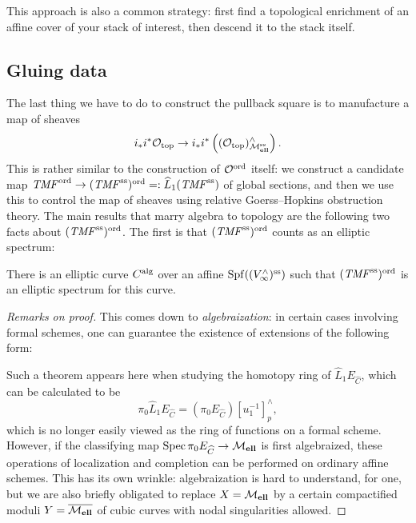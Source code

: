 \begin{remark}
This approach is also a common strategy: first find a topological enrichment of an affine cover of your stack of interest, then descend it to the stack itself.
\end{remark}





\subsection*{Gluing data}

The last thing we have to do to construct the pullback square is to manufacture a map of sheaves \[i_* i^* \mathcal{O}_{\mathrm{top}} \to i_* i^* \left((\mathcal{O}_{\mathrm{top}})^\wedge_{\mathcal{M}_{\mathbf{ell}}^{\mathrm{ss}}}\right).\]  This is rather similar to the construction of $\mathcal{O}^{\mathrm{ord}}$ itself: we construct a candidate map $\mathit{TMF}^{\mathrm{ord}} \to (\mathit{TMF}^{\mathrm{ss}})^{\mathrm{ord}} =: \widehat L_1 (\mathit{TMF}^{\mathrm{ss}})$ of global sections, and then we use this to control the map of sheaves using relative Goerss--Hopkins obstruction theory.  The main results that marry algebra to topology are the following two facts about $(\mathit{TMF}^{\mathrm{ss}})^{\mathrm{ord}}$.  The first is that $(\mathit{TMF}^{\mathrm{ss}})^{\mathrm{ord}}$ counts as an elliptic spectrum:

\begin{lemma}
There is an elliptic curve $C^{\mathrm{alg}}$ over an affine $\operatorname{Spf} ((V^\wedge_\infty)^{\mathrm{ss}})$ such that $(\mathit{TMF}^{\mathrm{ss}})^{\mathrm{ord}}$ is an elliptic spectrum for this curve.
\end{lemma}
\begin{proof}[Remarks on proof]
This comes down to \textit{algebraization}: in certain cases involving formal schemes, one can guarantee the existence of extensions of the following form:
\begin{center}
\end{center}
Such a theorem appears here when studying the homotopy ring of $\widehat L_1 E_{\widehat C}$, which can be calculated to be \[\pi_0 \widehat L_1 E_{\widehat C} = (\pi_0 E_{\widehat C})[u_1^{-1}]^\wedge_p,\] which is no longer easily viewed as the ring of functions on a formal scheme.  However, if the classifying map $\operatorname{Spec} \pi_0 E_{\widehat C} \to \mathcal{M}_{\mathbf{ell}}$ is first algebraized, these operations of localization and completion can be performed on ordinary affine schemes.  This has its own wrinkle: algebraization is hard to understand, for one, but we are also briefly obligated to replace $X = \mathcal{M}_{\mathbf{ell}}$ by a certain compactified moduli $Y = \overline{\mathcal{M}_{\mathbf{ell}}}$ of cubic curves with nodal singularities allowed.
\end{proof}


